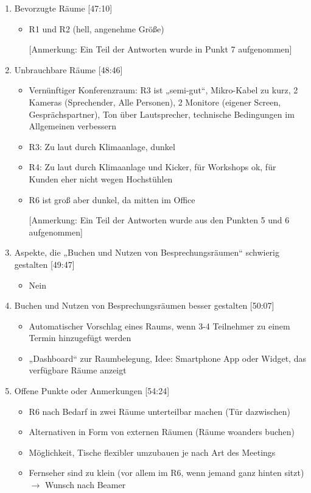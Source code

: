 \begin{enumerate}
    \item Bevorzugte Räume [47:10]
    \begin{itemize}
        \item R1 und R2 (hell, angenehme Größe)
        \item[] [Anmerkung: Ein Teil der Antworten wurde in Punkt 7 aufgenommen]
    \end{itemize}
    
    \item Unbrauchbare Räume [48:46]
    \begin{itemize}
        \item Vernünftiger Konferenzraum: R3 ist „semi-gut“, Mikro-Kabel zu kurz, 2 Kameras (Sprechender, Alle Personen), 2 Monitore (eigener Screen, Gesprächspartner), Ton über Lautsprecher, technische Bedingungen im Allgemeinen verbessern
        \item R3: Zu laut durch Klimaanlage, dunkel
        \item R4: Zu laut durch Klimaanlage und Kicker, für Workshops ok, für Kunden eher nicht wegen Hochstühlen
        \item R6 ist groß aber dunkel, da mitten im Office
        \item[] [Anmerkung: Ein Teil der Antworten wurde aus den Punkten 5 und 6 aufgenommen]
    \end{itemize}
        
    \item Aspekte, die „Buchen und Nutzen von Besprechungsräumen“ schwierig gestalten [49:47]
    \begin{itemize}
        \item Nein
    \end{itemize}
    
    \item Buchen und Nutzen von Besprechungsräumen besser gestalten [50:07]
    \begin{itemize}
        \item Automatischer Vorschlag eines Raums, wenn 3-4 Teilnehmer zu einem Termin hinzugefügt werden
        \item „Dashboard“ zur Raumbelegung, Idee: Smartphone App oder Widget, das verfügbare Räume anzeigt
    \end{itemize}
        
    \item Offene Punkte oder Anmerkungen [54:24]
    \begin{itemize}
        \item R6 nach Bedarf in zwei Räume unterteilbar machen (Tür dazwischen)
        \item Alternativen in Form von externen Räumen (Räume woanders buchen)
        \item Möglichkeit, Tische flexibler umzubauen je nach Art des Meetings
        \item Fernseher sind zu klein (vor allem im R6, wenn jemand ganz hinten sitzt) $\rightarrow$ Wunsch nach Beamer

    \end{itemize}
    
\end{enumerate}

